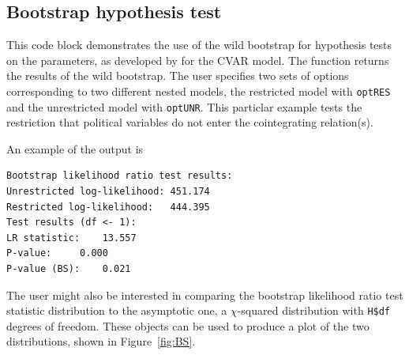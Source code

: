 \documentclass[article]{jss}
\newcommand{\fct}[1]{\code{#1()}}
\begin{document}
\subsection{Bootstrap hypothesis test}
\label{sec:bootstr-hypoth-test}

This code block
demonstrates the use of the wild bootstrap for hypothesis tests on the parameters, as developed by \cite{Boswijk2013} for the CVAR model. 
The function \fct{FCVARboot} returns the results of the wild bootstrap. 
The user specifies two sets of options corresponding to two different nested models, the restricted model with \verb|optRES| and the unrestricted model with \verb|optUNR|. 
This particlar example tests the restriction that political variables do not enter the cointegrating relation(s).




%

An example of the output is
\begin{verbatim}
Bootstrap likelihood ratio test results:
Unrestricted log-likelihood: 451.174
Restricted log-likelihood:   444.395
Test results (df <- 1):
LR statistic: 	 13.557
P-value: 	 0.000
P-value (BS): 	 0.021
\end{verbatim}

The user might also be interested in comparing the bootstrap likelihood ratio test statistic distribution to the asymptotic one, a $\chi$-squared distribution with \verb|H$df| degrees of freedom. 
These objects can be used to produce 
a plot of the two distributions, shown in Figure~\ref{fig:BS}.
\end{document}

